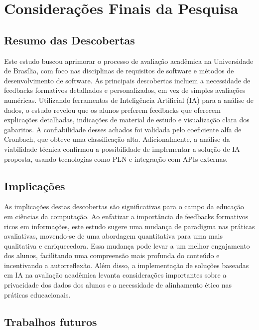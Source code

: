 \chapter{Considerações Finais da Pesquisa}

\section{Resumo das Descobertas}

Este estudo buscou aprimorar o processo de avaliação acadêmica na Universidade de Brasília, com foco nas disciplinas de requisitos de software e métodos de desenvolvimento de software. As principais descobertas incluem a necessidade de feedbacks formativos detalhados e personalizados, em vez de simples avaliações numéricas. Utilizando ferramentas de Inteligência Artificial (IA) para a análise de dados, o estudo revelou que os alunos preferem feedbacks que oferecem explicações detalhadas, indicações de material de estudo e visualização clara dos gabaritos. A confiabilidade desses achados foi validada pelo coeficiente alfa de Cronbach, que obteve uma classificação alta. Adicionalmente, a análise da viabilidade técnica confirmou a possibilidade de implementar a solução de IA proposta, usando tecnologias como PLN e integração com APIs externas.

\section{Implicações}

As implicações destas descobertas são significativas para o campo da educação em ciências da computação. Ao enfatizar a importância de feedbacks formativos ricos em informações, este estudo sugere uma mudança de paradigma nas práticas avaliativas, movendo-se de uma abordagem quantitativa para uma mais qualitativa e enriquecedora. Essa mudança pode levar a um melhor engajamento dos alunos, facilitando uma compreensão mais profunda do conteúdo e incentivando a autorreflexão. Além disso, a implementação de soluções baseadas em IA na avaliação acadêmica levanta considerações importantes sobre a privacidade dos dados dos alunos e a necessidade de alinhamento ético nas práticas educacionais.

\section{Trabalhos futuros}

